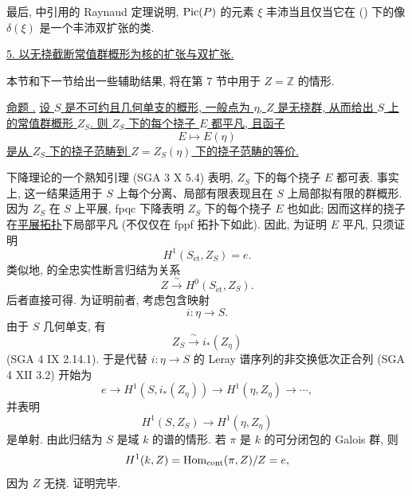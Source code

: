 最后,  中引用的 Raynaud 定理说明, $\operatorname{Pic}(P)$ 的元素 $\xi$ 丰沛当且仅当它在 () 下的像 $\delta(\xi)$ 是一个丰沛双扩张的类.



\medskip
\noindent\underline{5. 以无挠截断常值群概形为核的扩张与双扩张.}

本节和下一节给出一些辅助结果, 将在第 7 节中用于 $Z=\mathbb Z$ 的情形.

\medskip
\noindent\underline{命题 .} \underline{设 $S$ 是不可约且几何单支的概形, 一般点为 $\eta$, $Z$ 是无挠群, 从而给出 $S$ 上的常值群概形 $Z_S$. 则 $Z_S$ 下的每个挠子 $E$ 都平凡, 且函子}
\[
 E\longmapsto E(\eta)
\]
\underline{是从 $Z_S$ 下的挠子范畴到 $Z=Z_S(\eta)$ 下的挠子范畴的等价.}

下降理论的一个熟知引理 (SGA 3 X 5.4) 表明, $Z_S$ 下的每个挠子 $E$ 都可表. 事实上, 这一结果适用于 $S$ 上每个分离、局部有限表现且在 $S$ 上局部拟有限的群概形. 因为 $Z_S$ 在 $S$ 上平展, fpqc 下降表明 $Z_S$ 下的每个挠子 $E$ 也如此; 因而这样的挠子在\underline{平展拓扑}下局部平凡 (不仅仅在 fppf 拓扑下如此). 因此, 为证明 $E$ 平凡, 只须证明
\[
 H^1(S_{\mathrm{\acute{e}t}},Z_S)=e.
\]
类似地,  的全忠实性断言归结为关系
\[
 Z\xrightarrow{\ \sim\ }H^0(S_{\mathrm{\acute{e}t}},Z_S).
\]
后者直接可得. 为证明前者, 考虑包含映射
\[
 i:\eta\longrightarrow S.
\]
由于 $S$ 几何单支, 有
\[
 Z_S\xrightarrow{\ \sim\ }i_*(Z_\eta)
\]
(SGA 4 IX 2.14.1). 于是代替 $i:\eta\to S$ 的 Leray 谱序列的非交换低次正合列 (SGA 4 XII 3.2) 开始为
\[
 e\longrightarrow H^1(S,i_*(Z_\eta))
   \longrightarrow H^1(\eta,Z_\eta)\longrightarrow\cdots,
\]
并表明
\[
 H^1(S,Z_S)\longrightarrow H^1(\eta,Z_\eta)
\]
是单射. 由此归结为 $S$ 是域 $k$ 的谱的情形. 若 $\pi$ 是 $k$ 的可分闭包的 Galois 群, 则
\[
 H^1(k,Z)=\operatorname{Hom}_{\mathrm{cont}}(\pi,Z)/Z=e,
\]
因为 $Z$ 无挠. 证明完毕.


